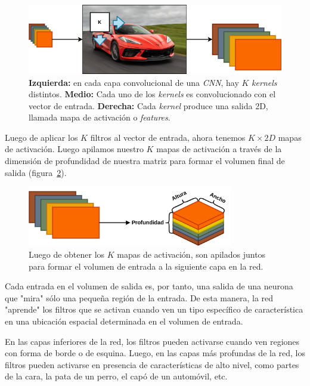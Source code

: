 \documentclass[a4paper,12pt]{article}
\begin{document}
\begin{figure}[H]
	\begin{center}				
	\includegraphics[width=1\textwidth]{feature-map-clean.png}
  	\caption{\textbf{Izquierda:} en cada capa convolucional de una \textit{CNN}, hay $K$ \textit{kernels} distintos. \textbf{Medio:} Cada uno de los \textit{kernels} es convolucionado con el vector de entrada. \textbf{Derecha:} Cada \textit{kernel} produce una salida 2D, llamada mapa de activación o \textit{features}.}
  	\label{fig:conv-mechanism}
  	\end{center}
\end{figure}

Luego de aplicar los $K$ filtros al vector de entrada, ahora tenemos $K \times 2D$ mapas de activación. Luego apilamos nuestro $K$ mapas de activación a través de la dimensión de profundidad de nuestra matriz para formar el volumen final de salida (figura~\ref{fig:k-maps}).

\begin{figure}[H]
	\begin{center}				
	\includegraphics[width=0.8\textwidth]{k-activation-map.png}
  	\caption{Luego de obtener los $K$ mapas de activación, son apilados juntos para formar el volumen de entrada a la siguiente capa en la red.}
  	\label{fig:k-maps}
  	\end{center}
\end{figure}

Cada entrada en el volumen de salida es, por tanto, una salida de una neurona que "mira" sólo una pequeña región de la entrada. De esta manera, la red "aprende" los filtros que se activan cuando ven un tipo específico de característica en una ubicación espacial determinada en el volumen de entrada.

En las capas inferiores de la red, los filtros pueden activarse cuando ven regiones con forma de borde o de esquina. Luego, en las capas más profundas de la red, los filtros pueden activarse en presencia de características de alto nivel, como partes de la cara, la pata de un perro, el capó de un automóvil, etc.
\end{document}
